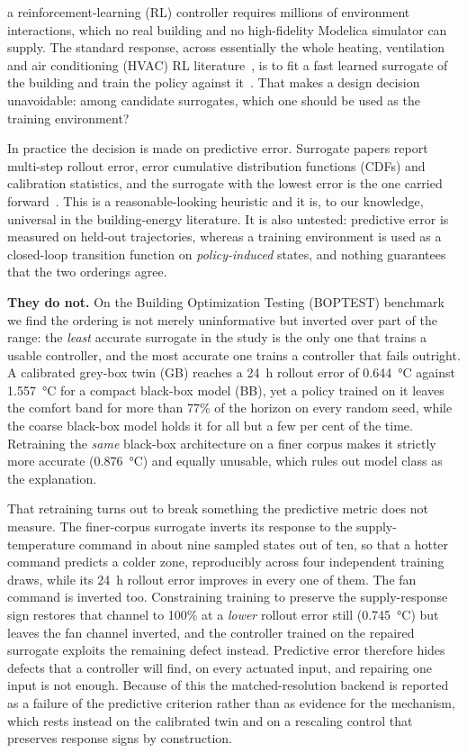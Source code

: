 \documentclass{ieeeaccess}
\begin{document}
 a reinforcement-learning (RL) controller requires
millions of environment interactions, which no real building and no
high-fidelity Modelica simulator can supply. The standard response, across
essentially the whole heating, ventilation and air conditioning (HVAC) RL
literature~\cite{AlSayed2024Review,Nguyen2024Modelling},
is to fit a fast learned surrogate of the building and train the policy against
it~\cite{HouEvins2024,Mshragi2026FastML}. That makes a design decision
unavoidable: among candidate surrogates, which one should be used as the
training environment?

In practice the decision is made on predictive error. Surrogate papers report
multi-step rollout error, error cumulative distribution functions (CDFs)
and calibration statistics, and the
surrogate with the lowest error is the one carried
forward~\cite{Bacher2011RCIdentification,Bunning2020RC,Chen2018NeuralODE,Raissi2019PINN,Hedayat2025PINN}.
This is a reasonable-looking heuristic and it is, to our knowledge, universal in
the building-energy literature. It is also untested: predictive error is
measured on held-out trajectories, whereas a training environment is used as a
closed-loop transition function on \emph{policy-induced} states, and nothing
guarantees that the two orderings agree.

\textbf{They do not.} On the Building Optimization Testing (BOPTEST) benchmark
we find the ordering is not
merely uninformative but inverted over part of the range: the \emph{least}
accurate surrogate in the study is the only one that trains a usable controller,
and the most accurate one trains a controller that fails outright. A calibrated
grey-box twin (GB) reaches a 24~h rollout error of \SI{0.644}{\celsius} against
\SI{1.557}{\celsius} for a compact black-box model (BB), yet a policy trained on it
leaves the comfort band for more than 77\% of the horizon on every random seed,
while the coarse black-box model holds it for all but a few per cent of the
time. Retraining the \emph{same} black-box architecture on a finer corpus makes
it strictly more accurate (\SI{0.876}{\celsius}) and equally unusable, which
rules out model class as the explanation.

That retraining turns out to break something the predictive metric does not
measure. The finer-corpus surrogate inverts its response to the
supply-temperature command in about nine sampled states out of ten, so that a
hotter command predicts a colder zone, reproducibly across four independent
training draws, while its 24~h rollout error improves in every one of them. The
fan command is inverted too. Constraining training to preserve the
supply-response sign restores that channel to 100\% at a \emph{lower} rollout
error still (\SI{0.745}{\celsius}) but leaves the fan channel inverted, and the
controller trained on the repaired surrogate exploits the remaining defect
instead. Predictive error therefore hides defects that a controller will find,
on every actuated input, and repairing one input is not enough. Because of this
the matched-resolution backend is reported as a failure of the predictive
criterion rather than as evidence for the mechanism, which rests instead on the
calibrated twin and on a rescaling control that preserves response signs by
construction.
\end{document}
